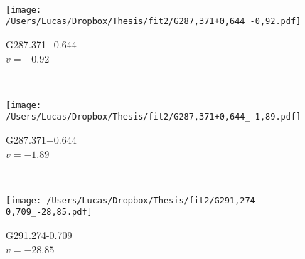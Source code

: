 \begin{figure*}[t]
	~
	\begin{subfigure}[t]{0.3\textwidth}
		\texttt{[image: /Users/Lucas/Dropbox/Thesis/fit2/G287,371+0,644\_-0,92.pdf]}
		\caption[]{G287.371+0.644\\$v=-0.92$\,\kms}
	\end{subfigure}
	~
	\begin{subfigure}[t]{0.3\textwidth}
		\texttt{[image: /Users/Lucas/Dropbox/Thesis/fit2/G287,371+0,644\_-1,89.pdf]}
		\caption[]{G287.371+0.644\\$v=-1.89$\,\kms}
	\end{subfigure}
	~
	\begin{subfigure}[t]{0.3\textwidth}
		\texttt{[image: /Users/Lucas/Dropbox/Thesis/fit2/G291,274-0,709\_-28,85.pdf]}
		\caption[]{G291.274-0.709\\$v=-28.85$\,\kms}
	\end{subfigure}
	~
\end{figure*}
\clearpage
